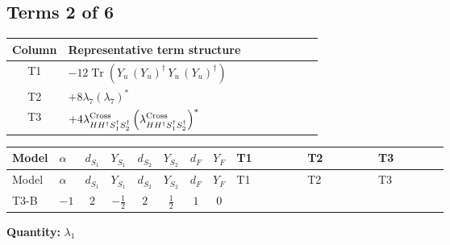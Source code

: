 \documentclass[8pt]{article}
\begin{document}
\begin{landscape}
\subsection*{Terms 2 of 6}
\begin{center}
\begin{tabular}{@{}c >{\raggedright\arraybackslash}p{0.82\linewidth}@{}}
\toprule
Column & Representative term structure \\
\midrule
T1 & \(\displaystyle -12 \operatorname{Tr}\!\left({Y_u}\,\left({Y_u}\right)^{\dagger}\,{Y_u}\,\left({Y_u}\right)^{\dagger}\right)\) \\
\midrule
T2 & \(\displaystyle +8 {\lambda_7} \left({\lambda_7}\right)^{*}\) \\
\midrule
T3 & \(\displaystyle +4 {\lambda_{H H^\dagger S_1^\dagger S_2^\dagger}^{\rm Cross}} \left({\lambda_{H H^\dagger S_1^\dagger S_2^\dagger}^{\rm Cross}}\right)^{*}\) \\
\midrule
\bottomrule
\end{tabular}
\end{center}
\smallskip
\tiny
\begin{longtable}{@{}llcccccc >{\raggedright\arraybackslash}p{0.21\linewidth} >{\raggedright\arraybackslash}p{0.21\linewidth} >{\raggedright\arraybackslash}p{0.21\linewidth}@{}}
\toprule
Model & $\alpha$ & $d_{S_1}$ & $Y_{S_1}$ & $d_{S_2}$ & $Y_{S_2}$ & $d_F$ & $Y_F$ & T1 & T2 & T3 \\
\midrule
\endfirsthead
\toprule
Model & $\alpha$ & $d_{S_1}$ & $Y_{S_1}$ & $d_{S_2}$ & $Y_{S_2}$ & $d_F$ & $Y_F$ & T1 & T2 & T3 \\
\midrule
\endhead
T3-B & $-1$ & $2$ & $-\frac{1}{2}$ & $2$ & $\frac{1}{2}$ & $1$ & $0$ & \scriptsize\adjustbox{max width=\linewidth}{$\begin{gathered} -12 \operatorname{Tr}\!\left({Y_u}\,\left({Y_u}\right)^{\dagger}\,{Y_u}\,\left({Y_u}\right)^{\dagger}\right)\end{gathered}$} & \scriptsize\adjustbox{max width=\linewidth}{$\begin{gathered} +8 {\lambda_7} \left({\lambda_7}\right)^{*}\end{gathered}$} & \scriptsize\adjustbox{max width=\linewidth}{$\begin{gathered} +4 {\lambda_{H H^\dagger S_1^\dagger S_2^\dagger}^{\rm Cross}} \left({\lambda_{H H^\dagger S_1^\dagger S_2^\dagger}^{\rm Cross}}\right)^{*}\end{gathered}$} \\
\midrule
\bottomrule
\end{longtable}
\clearpage
\noindent\textbf{Quantity: }$\lambda_1$\par\smallskip

\end{landscape}
\end{document}
